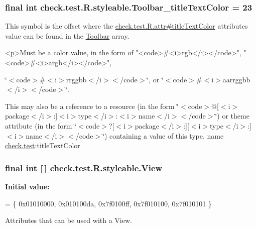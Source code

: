 \subsubsection[{Toolbar\+\_\+title\+Text\+Color}]{\setlength{\rightskip}{0pt plus 5cm}final int check.\+test.\+R.\+styleable.\+Toolbar\+\_\+title\+Text\+Color = 23\hspace{0.3cm}{\ttfamily [static]}}\label{classcheck_1_1test_1_1_r_1_1styleable_ad2cf34c85cd9f2275558a3082471052a}
This symbol is the offset where the \hyperlink{classcheck_1_1test_1_1_r_1_1attr_a05900c2c0b61d120064a083c8e2fcc8b}{check.\+test.\+R.\+attr\#title\+Text\+Color} attribute\textquotesingle{}s value can be found in the \hyperlink{classcheck_1_1test_1_1_r_1_1styleable_a1a7fa90223693abef77e7484cca2df54}{Toolbar} array.

\begin{DoxyVerb}      <p>Must be a color value, in the form of "<code>#<i>rgb</i></code>", "<code>#<i>argb</i></code>",
\end{DoxyVerb}
 \char`\"{}$<$code$>$\#$<$i$>$rrggbb$<$/i$>$$<$/code$>$\char`\"{}, or \char`\"{}$<$code$>$\#$<$i$>$aarrggbb$<$/i$>$$<$/code$>$\char`\"{}. 

This may also be a reference to a resource (in the form \char`\"{}$<$code$>$@\mbox{[}$<$i$>$package$<$/i$>$\+:\mbox{]}$<$i$>$type$<$/i$>$\+:$<$i$>$name$<$/i$>$$<$/code$>$\char`\"{}) or theme attribute (in the form \char`\"{}$<$code$>$?\mbox{[}$<$i$>$package$<$/i$>$\+:\mbox{]}\mbox{[}$<$i$>$type$<$/i$>$\+:\mbox{]}$<$i$>$name$<$/i$>$$<$/code$>$\char`\"{}) containing a value of this type.  name \hyperlink{namespacecheck_1_1test}{check.\+test}\+:title\+Text\+Color \hypertarget{classcheck_1_1test_1_1_r_1_1styleable_a649d1cf46b1780fca1185680fabbb1e1}{}
\subsubsection[{View}]{\setlength{\rightskip}{0pt plus 5cm}final int \mbox{[}$\,$\mbox{]} check.\+test.\+R.\+styleable.\+View\hspace{0.3cm}{\ttfamily [static]}}\label{classcheck_1_1test_1_1_r_1_1styleable_a649d1cf46b1780fca1185680fabbb1e1}
{\bfseries Initial value\+:}
\begin{DoxyCode}
= \{
            0x01010000, 0x010100da, 0x7f0100ff, 0x7f010100,
            0x7f010101
        \}
\end{DoxyCode}
Attributes that can be used with a View. 

